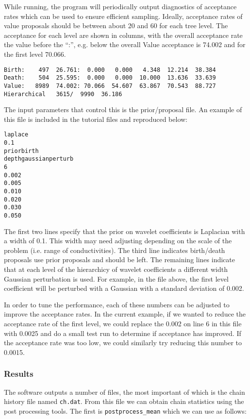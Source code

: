 \documentclass[a4paper,12pt]{article}
\begin{document}
While running, the program will periodically output diagnostics of acceptance rates which
can be used to ensure efficient sampling. Ideally, acceptance rates of value proposals
should be between about 20 and 60 for each tree level. The acceptance for each
level are shown in columns, with the overall acceptance rate the value before the ``:'',
e.g. below the overall Value acceptance is 74.002 and for the first level 70.066.

\begin{verbatim}
Birth:    497  26.761:  0.000   0.000   4.348  12.214  38.384 
Death:    504  25.595:  0.000   0.000  10.000  13.636  33.639 
Value:   8989  74.002: 70.066  54.607  63.867  70.543  88.727 
Hierarchical   3615/  9990  36.186
\end{verbatim}

The input parameters that control this is the prior/proposal file. An example of this
file is included in the tutorial files and reproduced below:

\begin{verbatim}
laplace
0.1
priorbirth
depthgaussianperturb
6
0.002
0.005
0.010
0.020
0.030
0.050
\end{verbatim}

The first two lines specify that the prior on wavelet coefficients is Laplacian with a
width of 0.1. This width may need adjusting depending on the scale of the problem (i.e.
range of conductivities). The third line indicates birth/death proposals use prior
proposals and should be left. The remaining lines indicate that at each level of the
hierarchicy of wavelet coefficients a different width Gaussian perturbation is used.
For example, in the file above, the first level coefficient will be perturbed with
a Gaussian with a standard deviation of 0.002.

In order to tune the performance, each of these numbers can be adjusted to improve
the acceptance rates. In the current example, if we wanted to reduce the acceptance
rate of the first level, we could replace the 0.002 on line 6 in this file with
0.0025 and do a small test run to determine if acceptance has improved. If the acceptance
rate was too low, we could similarly try reducing this number to 0.0015.

\subsubsection{Results}

The software outputs a number of files, the most important of which is the
chain history file named {\tt ch.dat}. From this file we can obtain chain statistics
using the post processing tools. The first is {\tt postprocess\_mean} which we
can use as follows:
\end{document}
